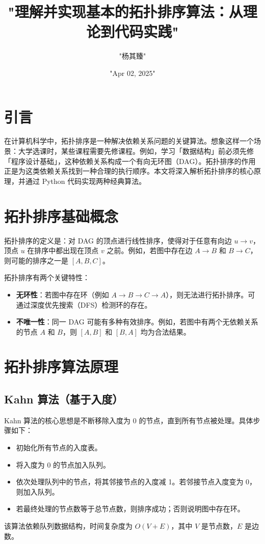 \title{"理解并实现基本的拓扑排序算法：从理论到代码实践"}
\author{"杨其臻"}
\date{"Apr 02, 2025"}
\maketitle
\chapter{引言}
在计算机科学中，拓扑排序是一种解决依赖关系问题的关键算法。想象这样一个场景：大学选课时，某些课程需要先修课程。例如，学习「数据结构」前必须先修「程序设计基础」，这种依赖关系构成一个有向无环图（DAG）。拓扑排序的作用正是为这类依赖关系找到一种合理的执行顺序。本文将深入解析拓扑排序的核心原理，并通过 Python 代码实现两种经典算法。\par
\chapter{拓扑排序基础概念}
拓扑排序的定义是：对 DAG 的顶点进行线性排序，使得对于任意有向边 $u \to v$，顶点 $u$ 在排序中都出现在顶点 $v$ 之前。例如，若图中存在边 $A \to B$ 和 $B \to C$，则可能的排序之一是 $[A, B, C]$。\par
拓扑排序有两个关键特性：\par
\begin{itemize}
\item \textbf{无环性}：若图中存在环（例如 $A \to B \to C \to A$），则无法进行拓扑排序。可通过深度优先搜索（DFS）检测环的存在。
\item \textbf{不唯一性}：同一 DAG 可能有多种有效排序。例如，若图中有两个无依赖关系的节点 $A$ 和 $B$，则 $[A, B]$ 和 $[B, A]$ 均为合法结果。
\end{itemize}
\chapter{拓扑排序算法原理}
\section{Kahn 算法（基于入度）}
Kahn 算法的核心思想是不断移除入度为 0 的节点，直到所有节点被处理。具体步骤如下：\par
\begin{itemize}
\item 初始化所有节点的入度表。
\item 将入度为 0 的节点加入队列。
\item 依次处理队列中的节点，将其邻接节点的入度减 1。若邻接节点入度变为 0，则加入队列。
\item 若最终处理的节点数等于总节点数，则排序成功；否则说明图中存在环。
\end{itemize}
该算法依赖队列数据结构，时间复杂度为 $O(V + E)$，其中 $V$ 是节点数，$E$ 是边数。\par
